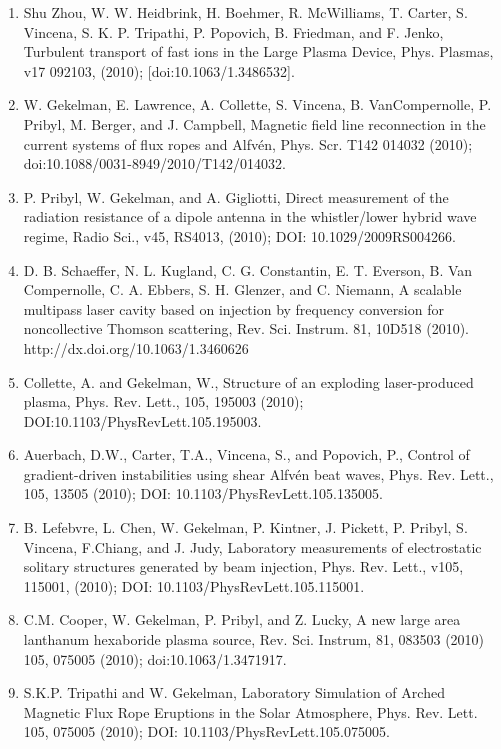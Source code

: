 \documentclass[11pt]{article}
\begin{document}
\begin{enumerate}
\item Shu Zhou, W. W. Heidbrink, H. Boehmer, R. McWilliams, T. Carter, S. Vincena, S. K. P. Tripathi, P. Popovich, B. Friedman, and F. Jenko, Turbulent transport of fast ions in the Large Plasma Device, Phys. Plasmas, v17 092103, (2010); [doi:10.1063/1.3486532].

\item  W. Gekelman, E. Lawrence, A. Collette, S. Vincena, B. VanCompernolle, P. Pribyl, M. Berger, and J. Campbell, Magnetic field line reconnection in the current systems of flux ropes and Alfv\'{e}n, Phys. Scr. T142 014032 (2010); doi:10.1088/0031-8949/2010/T142/014032.

\item  P. Pribyl, W. Gekelman, and A. Gigliotti, Direct measurement of the radiation resistance of a dipole antenna in the whistler/lower hybrid wave regime, Radio Sci., v45, RS4013, (2010); DOI: 10.1029/2009RS004266.

\item  D. B. Schaeffer, N. L. Kugland, C. G. Constantin, E. T. Everson, B. Van Compernolle, C. A. Ebbers, S. H. Glenzer, and C. Niemann, A scalable multipass laser cavity based on injection by frequency conversion for noncollective Thomson scattering, Rev. Sci. Instrum. 81, 10D518 (2010).  http://dx.doi.org/10.1063/1.3460626

\item  Collette, A. and Gekelman, W., Structure of an exploding laser-produced plasma, Phys. Rev. Lett., 105, 195003 (2010); DOI:10.1103/PhysRevLett.105.195003.

\item  Auerbach, D.W., Carter, T.A., Vincena, S., and Popovich, P., Control of gradient-driven instabilities using shear Alfv\'{e}n beat waves, Phys. Rev. Lett., 105, 13505 (2010); DOI: 10.1103/PhysRevLett.105.135005.

\item  B. Lefebvre, L. Chen, W. Gekelman, P. Kintner, J. Pickett, P. Pribyl, S. Vincena, F.Chiang, and J. Judy, Laboratory measurements of electrostatic solitary structures generated by beam injection, Phys. Rev. Lett., v105, 115001, (2010); DOI: 10.1103/PhysRevLett.105.115001.

\item  C.M. Cooper, W. Gekelman, P. Pribyl, and Z. Lucky, A new large area lanthanum hexaboride plasma source, Rev. Sci. Instrum, 81, 083503 (2010) 105, 075005 (2010); doi:10.1063/1.3471917.

\item   S.K.P. Tripathi and W. Gekelman, Laboratory Simulation of Arched Magnetic Flux Rope Eruptions in the Solar Atmosphere, Phys. Rev. Lett. 105, 075005 (2010); DOI: 10.1103/PhysRevLett.105.075005.


\end{enumerate}
\end{document}
